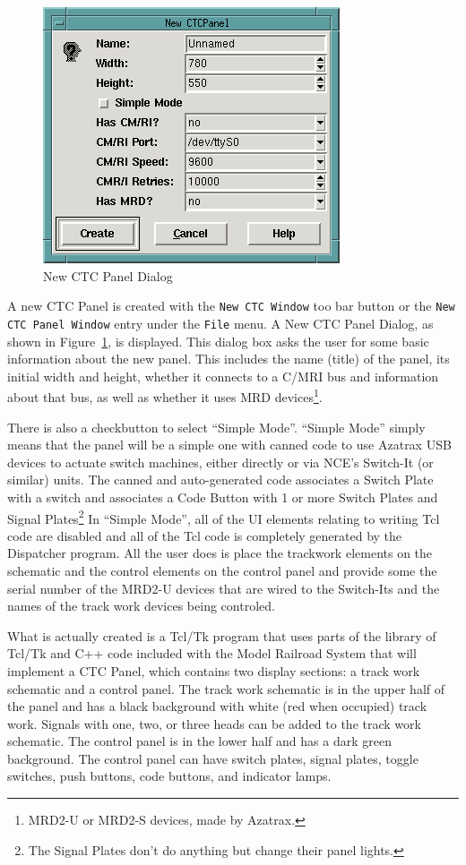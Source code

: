 \begin{figure}[hbpt] \begin{centering}
\includegraphics{DISPNewCTCPanel.png} \caption{New CTC Panel Dialog}
\label{fig:dispatcher:newCTCPanel} \end{centering} \end{figure} A new
CTC Panel is created with the \verb=New CTC Window= too bar button or
the \verb=New CTC Panel Window= entry under the \verb=File= menu.  A
New CTC Panel Dialog, as shown in
Figure~\ref{fig:dispatcher:newCTCPanel}, is displayed. This dialog box
asks the user for some basic information about the new panel.  This
includes the name (title) of the panel, its initial width and height,
whether it connects to a C/MRI bus and information about that bus, as
well as whether it uses MRD devices\footnote{MRD2-U or MRD2-S devices,
made by Azatrax.}. 

There is also a checkbutton to select ``Simple Mode''.  ``Simple Mode''
simply means that the panel will be a simple one with canned code to
use Azatrax USB devices to actuate switch machines, either directly or
via NCE's Switch-It (or similar) units. The canned and auto-generated
code associates a Switch Plate with a switch and associates a Code
Button with 1 or more Switch Plates and Signal Plates\footnote{The
Signal Plates don't do anything but change their panel lights.}  In
``Simple Mode'', all of the UI elements relating to writing Tcl code
are disabled and all of the Tcl code is completely generated by the
Dispatcher program.  All the user does is place the trackwork elements
on the schematic and the control elements on the control panel and
provide some the serial number of the MRD2-U devices that are wired to
the Switch-Its and the names of the track work devices being controled.

What is actually created is a Tcl/Tk program that uses parts of the
library of Tcl/Tk and C++ code included with the Model Railroad System
that will implement a CTC Panel, which contains two display sections: a
track work schematic and a control panel.  The track work schematic is in
the upper half of the panel and has a black background with white (red
when occupied) track work. Signals with one, two, or three heads can be
added to the track work schematic.  The control panel is in the lower
half and has a dark green background. The control panel can have switch
plates, signal plates, toggle switches, push buttons, code buttons, and
indicator lamps.


